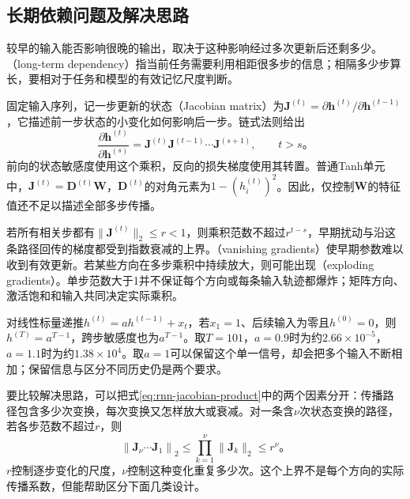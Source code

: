 \subsection{长期依赖问题及解决思路}
\label{sec:rnn-long-dependencies}

较早的输入能否影响很晚的输出，取决于这种影响经过多次更新后还剩多少。（long-term dependency）指当前任务需要利用相距很多步的信息；相隔多少步算长，要相对于任务和模型的有效记忆尺度判断。

固定输入序列，记一步更新的状态（Jacobian matrix）为$\bm{J}^{(t)}=\partial\bm{h}^{(t)}/\partial\bm{h}^{(t-1)}$，它描述前一步状态的小变化如何影响后一步。链式法则给出
\begin{equation}
  \frac{\partial\bm{h}^{(t)}}{\partial\bm{h}^{(s)}}
    =\bm{J}^{(t)}\bm{J}^{(t-1)}\cdots\bm{J}^{(s+1)},
    \qquad t>s\text{。}
  \label{eq:rnn-jacobian-product}
\end{equation}
前向的状态敏感度使用这个乘积，反向的损失梯度使用其转置。普通Tanh单元中，$\bm{J}^{(t)}=\bm{D}^{(t)}\bm{W}$，$\bm{D}^{(t)}$的对角元素为$1-(h_i^{(t)})^2$。因此，仅控制$\bm{W}$的特征值还不足以描述全部多步传播。

若所有相关步都有$\lVert\bm{J}^{(t)}\rVert_2\leq r<1$，则乘积范数不超过$r^{t-s}$，早期扰动与沿这条路径回传的梯度都受到指数衰减的上界。（vanishing gradients）使早期参数难以收到有效更新。若某些方向在多步乘积中持续放大，则可能出现（exploding gradients）。单步范数大于1并不保证每个方向或每条输入轨迹都爆炸；矩阵方向、激活饱和和输入共同决定实际乘积。

\begin{example}[传播距离与状态保留]
  \label{ex:rnn-memory-decay}
  对线性标量递推$h^{(t)}=a h^{(t-1)}+x_t$，若$x_1=1$、后续输入为零且$h^{(0)}=0$，则$h^{(T)}=a^{T-1}$，跨步敏感度也为$a^{T-1}$。取$T=101$，$a=0.9$时为约$2.66\times10^{-5}$，$a=1.1$时为约$1.38\times10^4$。取$a=1$可以保留这个单一信号，却会把多个输入不断相加；保留信息与区分不同历史仍是两个要求。
\end{example}

要比较解决思路，可以把式\eqref{eq:rnn-jacobian-product}中的两个因素分开：传播路径包含多少次变换，每次变换又怎样放大或衰减。对一条含$\nu$次状态变换的路径，若各步范数不超过$r$，则
\begin{equation}
  \left\lVert\bm J_{\nu}\cdots\bm J_1\right\rVert_2
    \leq\prod_{k=1}^{\nu}\lVert\bm J_k\rVert_2\leq r^{\nu}\text{。}
  \label{eq:rnn-path-length-rate}
\end{equation}
$r$控制逐步变化的尺度，$\nu$控制这种变化重复多少次。这个上界不是每个方向的实际传播系数，但能帮助区分下面几类设计。

